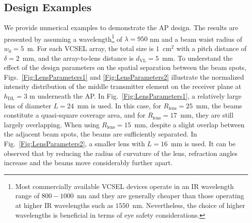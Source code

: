 \documentclass[lettersize,journal]{IEEEtran}
\begin{document}
\subsection{Design Examples}
We provide numerical examples to demonstrate the \ac{AP} design. The results are presented by assuming a wavelength\footnote{Most commercially available \ac{VCSEL} devices operate in an \ac{IR} wavelength range of $800-1000$~nm and they are generally cheaper than those operating at higher \ac{IR} wavelengths such as $1550$~nm. Nevertheless, the choice of higher wavelengths is beneficial in terms of eye safety considerations.} of $\lambda=950$ nm and a beam waist radius of $w_0=5$~{\textmu}m. For each \ac{VCSEL} array, the total size is $1$~cm$^2$ with a pitch distance of $\delta = 2$~mm, and the array-to-lens distance is $d_\mathrm{VL}=5$~mm. To understand the effect of the design parameters on the spatial separation between the beam spots, Figs.~\ref{Fig:LensParameters1} and \ref{Fig:LensParameters2} illustrate the normalized intensity distribution of the middle transmitter element on the receiver plane at $h_\mathrm{DL}=3$ m underneath the \ac{AP}. In Fig.~\ref{Fig:LensParameters1}, a relatively large lens of diameter $L=24$~mm is used. In this case, for $R_\mathrm{lens}=25$~mm, the beams constitute a quasi-square coverage area, and for $R_\mathrm{lens}=17$~mm, they are still largely overlapping. When using $R_\mathrm{lens}=15$~mm, despite a slight overlap between the adjacent beam spots, the beams are sufficiently separated. In Fig.~\ref{Fig:LensParameters2}, a smaller lens with $L=16$~mm is used. It can be observed that by reducing the radius of curvature of the lens, refraction angles increase and the beams move considerably further apart.
\end{document}

